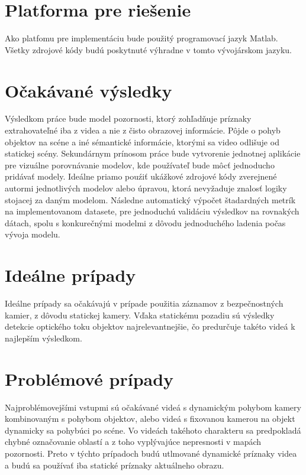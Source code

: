 \section{Platforma pre riešenie}
Ako platfomu pre implementáciu bude použitý programovací jazyk Matlab\textregistered.
Všetky zdrojové kódy budú poskytnuté výhradne v tomto vývojárskom jazyku.
\section{Očakávané výsledky}
Výsledkom práce bude model pozornosti, ktorý zohľadňuje príznaky extrahovateľné iba z videa a nie z čisto obrazovej informácie.
Pôjde o pohyb objektov na scéne a iné sémantické informácie, ktorými sa video odlišuje od statickej scény.
Sekundárnym prínosom práce bude vytvorenie jednotnej aplikácie pre vizuálne porovnávanie modelov, kde používateľ bude môcť jednoducho pridávať modely. Ideálne priamo pouźiť ukážkové zdrojové kódy zverejnené autormi jednotlivých modelov alebo úpravou, ktorá nevyžaduje znalosť logiky stojacej za daným modelom.
Následne automatický výpočet štadardných metrík na implementovanom datasete, pre jednoduchú validáciu výsledkov na rovnakých dátach, spolu s konkurečnými modelmi z dôvodu jednoduchého ladenia počas vývoja modelu.
\section{Ideálne prípady}
Ideálne prípady sa očakávajú v prípade použitia záznamov z bezpečnostných kamier, z dôvodu statickej kamery.
Vďaka statickému pozadiu sú výsledky detekcie optického toku objektov najrelevantnejšie, čo predurčuje takéto videá k najlepším výsledkom.
\section{Problémové prípady}
Najproblémovejšími vstupmi sú očakávané videá s dynamickým pohybom kamery kombinovaným s pohybom objektov, alebo videá s fixovanou kamerou na objekt dynamicky sa pohybúci po scéne.
Vo videách takéhoto charakteru sa predpokladá chybné označovanie oblastí a z toho vyplývajúce nepresnosti v mapách pozornosti.
Preto v týchto prípadoch budú utlmované dynamické príznaky videa a budú sa používať iba statické príznaky aktuálneho obrazu.

